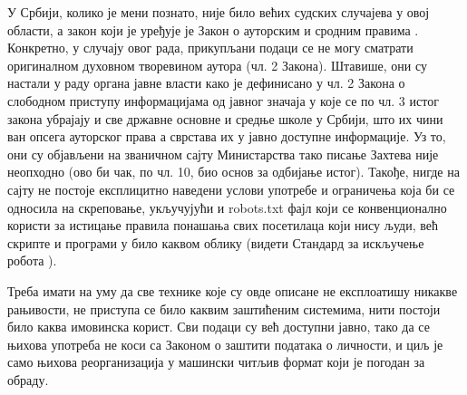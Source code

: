 У Србији, колико је мени познато, није било већих судских случајева у овој области, а закон који је уређује је Закон о ауторским и сродним правима \citep{autorskaprava}. Конкретно, у случају овог рада, прикупљани подаци се не могу сматрати оригиналном духовном творевином аутора (чл. 2 Закона). Штавише, они су настали у раду органа јавне власти како је дефинисано у чл. 2 Закона о слободном приступу информацијама од јавног значаја \citep{zospi} у које се по чл. 3 истог закона убрајају и све државне основне и средње школе у Србији, што их чини ван опсега ауторског права а сврстава их у јавно доступне информације. Уз то, они су објављени на званичном сајту Министарства тако писање Захтева није неопходно (ово би чак, по чл. 10, био основ за одбијање истог). Такође, нигде на сајту не постоје експлицитно наведени услови употребе и ограничења која би се односила на скреповање, укључујући и robots.txt фајл који се конвенционално користи за истицање правила понашања свих посетилаца који нису људи, већ скрипте и програми у било каквом облику (видети Стандард за искључење робота \citep{robotstxt}).

Треба имати на уму да све технике које су овде описане не експлоатишу никакве рањивости, не приступа се било каквим заштићеним системима, нити постоји било каква имовинска корист. Сви подаци су већ доступни јавно, тако да се њихова употреба не коси са Законом о заштити података о личности, и циљ је само њихова реорганизација у машински читљив формат који је погодан за обраду.